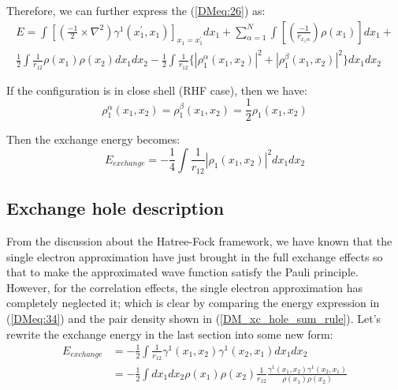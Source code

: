 Therefore, we can further express the (\ref{DMeq:26}) as:
\begin{multline}
\label{DMeq:34}
  E = \int \left[\left(\frac{-1}{2}\times\nabla^2\right)
    \gamma^{1}(x^{'}_{1}, x_{1})\right]_{x_{1} = x_{1}^{'}} dx_{1} +
  \sum_{\alpha=1}^{N}\int
  \left[\left(\frac{-1}{r_{x_{1}\alpha}}\right) \rho(x_{1})\right]
  dx_{1} + \\
\frac{1}{2}\int \frac{1}{r_{12}} \rho(x_{1})\rho(x_{2})dx_{1}dx_{2}
- \frac{1}{2}\int \frac{1}{r_{12}}
  \Bigg\{|\rho^{\alpha}_{1}(x_{1},x_{2})|^{2} +
         |\rho^{\beta}_{1}(x_{1},x_{2})|^{2}\Bigg\}dx_{1}dx_{2}
\end{multline}

If the configuration is in close shell (RHF case), then we have:
\begin{equation}
  \label{DMeq:35}
  \rho^{\alpha}_{1}(x_{1},x_{2})=
  \rho^{\beta}_{1}(x_{1},x_{2})=
\frac{1}{2}\rho_{1}(x_{1},x_{2})
\end{equation}

Then the exchange energy becomes:
\begin{equation}
  \label{DMeq:36}
    E_{exchange} =  -\frac{1}{4}\int \frac{1}{r_{12}}
  |\rho_{1}(x_{1},x_{2})|^{2}dx_{1}dx_{2}
\end{equation}


\subsection{Exchange hole description}\label{DM:2}
%
%
%
%
From the discussion about the Hatree-Fock framework, we have known
that the single electron approximation have just brought in the full
exchange effects so that to make the approximated wave function
satisfy the Pauli principle. However, for the correlation effects,
the single electron approximation has completely neglected it; which
is clear by comparing the energy expression in (\ref{DMeq:34}) and
the pair density shown in (\ref{DM_xc_hole_sum_rule}). Let's rewrite 
the exchange energy in the last section into some new form: 
\begin{equation}
\begin{split}
E_{exchange} &=  -\frac{1}{2}\int \frac{1}{r_{12}}
  \gamma^{1}(x_{1},x_{2})\gamma^{1}(x_{2},x_{1})dx_{1}dx_{2} \\
&= -\frac{1}{2}\int dx_{1}dx_{2} \rho(x_{1})\rho(x_{2})
\frac{1}{r_{12}}
\frac{\gamma^{1}(x_{1},x_{2})\gamma^{1}(x_{2},x_{1})}{\rho(x_{1})\rho(x_{2})}
\end{split}
\end{equation}

